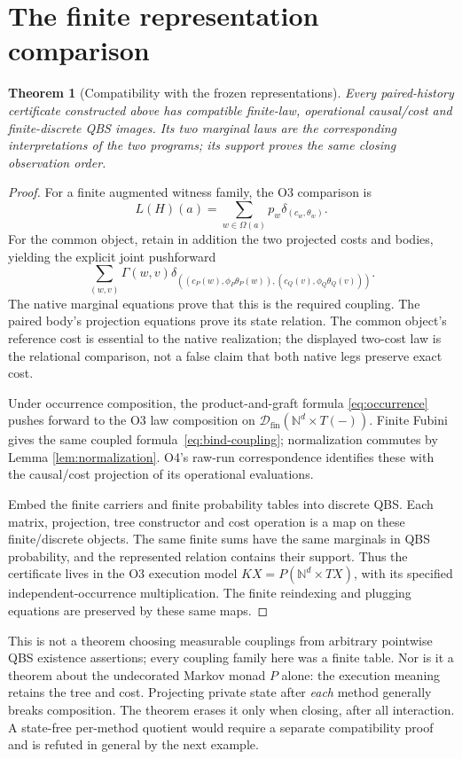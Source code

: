\documentclass[11pt,a4paper]{article}
\newtheorem{theorem}{Theorem}[section]
\theoremstyle{definition}
\newcommand{\Dfin}{\mathcal D_{\mathrm{fin}}}
\begin{document}
\section{The finite representation comparison}\label{sec:representation}
\begin{theorem}[Compatibility with the frozen representations]
\label{thm:representation}
Every paired-history certificate constructed above has compatible
finite-law, operational causal/cost and finite-discrete QBS images.
Its two marginal laws are the corresponding interpretations of the two
programs; its support proves the same closing observation order.
\end{theorem}
\begin{proof}
For a finite augmented witness family, the O3 comparison is
\[
 L(H)(a)=\sum_{w\in\Omega(a)}p_w\delta_{(c_w,\theta_w)}.
\]
For the common object, retain in addition the two projected costs and
bodies, yielding the explicit joint pushforward
\[
 \sum_{(w,v)}\Gamma(w,v)
       \delta_{((c_P(w),\phi_P\theta_P(w)),
                 (c_Q(v),\phi_Q\theta_Q(v)))}.
\]
The native marginal equations prove that this is the required coupling.
The paired body's projection equations prove its state relation. The
common object's reference cost is essential to the native realization;
the displayed two-cost law is the relational comparison, not a false
claim that both native legs preserve exact cost.

Under occurrence composition, the product-and-graft formula
\eqref{eq:occurrence} pushes forward to the O3 law composition on
$\Dfin(\mathbb N^d\times T(-))$. Finite Fubini gives the same coupled
formula~\eqref{eq:bind-coupling}; normalization commutes by Lemma
\ref{lem:normalization}. O4's raw-run correspondence identifies these
with the causal/cost projection of its operational evaluations.

Embed the finite carriers and finite probability tables into discrete
QBS. Each matrix, projection, tree constructor and cost operation is a
map on these finite/discrete objects. The same finite sums have the same
marginals in QBS probability, and the represented relation contains their
support. Thus the certificate lives in the O3 execution model
$KX=P(\mathbb N^d\times TX)$, with its specified independent-occurrence
multiplication. The finite reindexing and plugging equations are
preserved by these same maps.
\end{proof}
This is not a theorem choosing measurable couplings from arbitrary
pointwise QBS existence assertions; every coupling family here was a
finite table. Nor is it a theorem about the undecorated Markov monad
$P$ alone: the execution meaning retains the tree and cost. Projecting
private state after \emph{each} method generally breaks composition.
The theorem erases it only when closing, after all interaction. A
state-free per-method quotient would require a separate compatibility
proof and is refuted in general by the next example.
\end{document}
